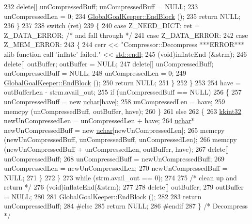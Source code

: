 \begin{DoxyCode}
232       \textcolor{keyword}{delete}[]  unCompressedBuff;     unCompressedBuff    = NULL;
233       unCompressedLen = 0;
234       \hyperlink{class_k_k_b_1_1_global_goal_keeper_a4e03a2807ca2f00c359da8625afb4cc5}{GlobalGoalKeeper::EndBlock} ();
235       \textcolor{keywordflow}{return} NULL;
236     \}
237 
238     \textcolor{keywordflow}{switch} (ret) 
239     \{
240     \textcolor{keywordflow}{case} Z\_NEED\_DICT:  ret = Z\_DATA\_ERROR;     \textcolor{comment}{/* and fall through */}
241     \textcolor{keywordflow}{case} Z\_DATA\_ERROR:
242     \textcolor{keywordflow}{case} Z\_MEM\_ERROR:
243       \{
244         cerr << \textcolor{stringliteral}{"Compressor::Decompress  ***ERROR***  zlib function call 'inflate'  failed."}  << 
      \hyperlink{namespace_k_k_b_ad1f50f65af6adc8fa9e6f62d007818a8}{std::endl};
245         (void)inflateEnd (&strm);
246         \textcolor{keyword}{delete}[]  outBuffer;          outBuffer        = NULL;
247         \textcolor{keyword}{delete}[]  unCompressedBuff;   unCompressedBuff = NULL;
248         unCompressedLen = 0;
249         \hyperlink{class_k_k_b_1_1_global_goal_keeper_a4e03a2807ca2f00c359da8625afb4cc5}{GlobalGoalKeeper::EndBlock} ();
250         \textcolor{keywordflow}{return} NULL;
251       \}
252     \}
253 
254     have = outBufferLen - strm.avail\_out;
255     \textcolor{keywordflow}{if}  (unCompressedBuff == NULL)
256     \{
257       unCompressedBuff = \textcolor{keyword}{new} \hyperlink{namespace_k_k_b_ace9969169bf514f9ee6185186949cdf7}{uchar}[have];
258       unCompressedLen = have;
259       memcpy (unCompressedBuff, outBuffer, have);
260     \}
261     \textcolor{keywordflow}{else}
262     \{
263       \hyperlink{namespace_k_k_b_a8fa4952cc84fda1de4bec1fbdd8d5b1b}{kkint32}  newUnCompressedLen = unCompressedLen + have;
264       \hyperlink{namespace_k_k_b_ace9969169bf514f9ee6185186949cdf7}{uchar}* newUnCompressedBuff  = \textcolor{keyword}{new} \hyperlink{namespace_k_k_b_ace9969169bf514f9ee6185186949cdf7}{uchar}[newUnCompressedLen];
265       memcpy (newUnCompressedBuff, unCompressedBuff, unCompressedLen);
266       memcpy (newUnCompressedBuff + unCompressedLen, outBuffer, have);
267       \textcolor{keyword}{delete}[]  unCompressedBuff;
268       unCompressedBuff = newUnCompressedBuff;
269       unCompressedLen = newUnCompressedLen;
270       newUnCompressedBuff = NULL;
271     \}
272   \}
273   \textcolor{keywordflow}{while} (strm.avail\_out == 0);
274 
275   \textcolor{comment}{/* clean up and return */}
276   (void)inflateEnd(&strm);
277 
278   \textcolor{keyword}{delete}[]  outBuffer;
279   outBuffer = NULL;
280 
281   \hyperlink{class_k_k_b_1_1_global_goal_keeper_a4e03a2807ca2f00c359da8625afb4cc5}{GlobalGoalKeeper::EndBlock} ();
282 
283   \textcolor{keywordflow}{return}  unCompressedBuff;
284 \textcolor{preprocessor}{#else}
285   \textcolor{keywordflow}{return} NULL;
286 \textcolor{preprocessor}{#endif}
287 \}  \textcolor{comment}{/* Decompress */}
\end{DoxyCode}
